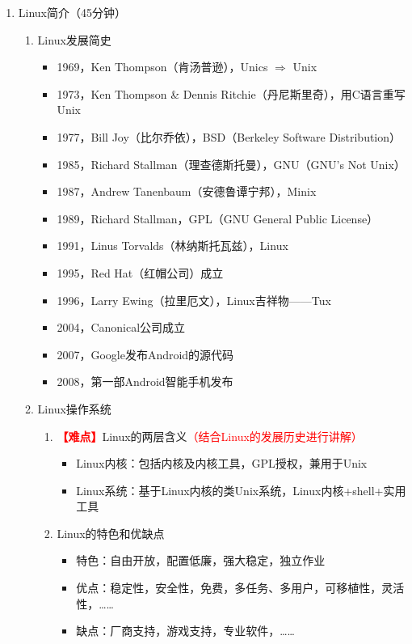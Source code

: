 \documentclass{TIJMUjiaoanLL}
\begin{document}
\begin{enumerate}
  \item Linux简介（45分钟）
    \begin{enumerate}
      \item Linux发展简史
	\begin{itemize}
          \item 1969，Ken Thompson（肯\textbullet 汤普逊），Unics $\Rightarrow$ Unix
          \item 1973，Ken Thompson \& Dennis Ritchie（丹尼斯\textbullet 里奇），用C语言重写Unix
          \item 1977，Bill Joy（比尔\textbullet 乔依），BSD（Berkeley Software Distribution）
	  \item 1985，Richard Stallman（理查德\textbullet 斯托曼），GNU（GNU's Not Unix）
          \item 1987，Andrew Tanenbaum（安德鲁\textbullet 谭宁邦），Minix
          \item 1989，Richard Stallman，GPL（GNU General Public License）
          \item 1991，Linus Torvalds（林纳斯\textbullet 托瓦兹），Linux
          \item 1995，Red Hat（红帽公司）成立
          \item 1996，Larry Ewing（拉里\textbullet 厄文），Linux吉祥物——Tux
          \item 2004，Canonical公司成立
          \item 2007，Google发布Android的源代码
          \item 2008，第一部Android智能手机发布
	\end{itemize}
      \item Linux操作系统
	\begin{enumerate}
	  \item \textcolor{red}{\textbf{【难点】}}Linux的两层含义\textcolor{red}{（结合Linux的发展历史进行讲解）}
	    \begin{itemize}
	      \item Linux内核：包括内核及内核工具，GPL授权，兼用于Unix
	      \item Linux系统：基于Linux内核的类Unix系统，Linux内核+shell+实用工具
	    \end{itemize}
	  \item Linux的特色和优缺点
	    \begin{itemize}
	      \item 特色：自由开放，配置低廉，强大稳定，独立作业
	      \item 优点：稳定性，安全性，免费，多任务、多用户，可移植性，灵活性，……
	      \item 缺点：厂商支持，游戏支持，专业软件，……

\end{itemize}
\end{enumerate}
\end{enumerate}
\end{enumerate}
\end{document}
